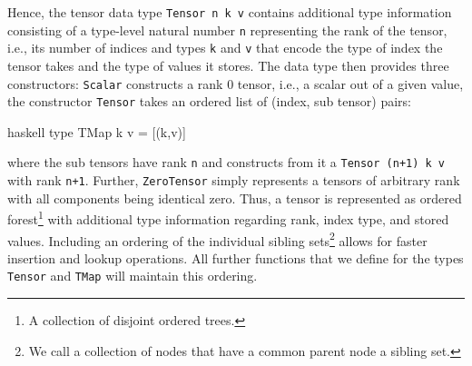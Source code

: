Hence, the tensor data type \texttt{Tensor n k v} contains additional type information consisting of a type-level natural number \texttt{n} representing the rank of the tensor, i.e., its number of indices and types \texttt{k} and \texttt{v} that encode the type of index the tensor takes and the type of values it stores. The data type then provides three constructors: \texttt{Scalar} constructs a rank 0 tensor, i.e., a scalar out of a given value, the constructor \texttt{Tensor} takes an ordered list of (index, sub tensor) pairs:
\begin{center}
\begin{cminted}{haskell}
type TMap k v = [(k,v)]
\end{cminted}
\end{center}
where the sub tensors have rank \texttt{n} and constructs from it a \texttt{Tensor (n+1) k v} with rank \texttt{n+1}. Further, \texttt{ZeroTensor} simply represents a tensors of arbitrary rank with all components being identical zero. Thus, a tensor is represented as ordered forest\footnote{A collection of disjoint ordered trees.} with additional type information regarding rank, index type, and stored values. Including an ordering of the individual sibling sets\footnote{We call a collection of nodes that have a common parent node a sibling set.} allows for faster insertion and lookup operations. All further functions that we define for the types \texttt{Tensor} and \texttt{TMap} will maintain this ordering.

